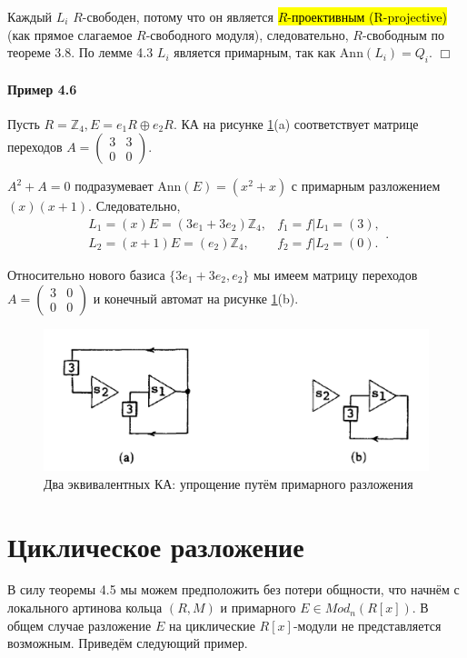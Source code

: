 \documentclass[a4paper,12pt]{article}
\newcommand{\Ann}{\text{Ann}}
\begin{document}
Каждый $L_i$ $R$-свободен, потому что он является \hl{$R$-проективным (R-projective)} (как прямое слагаемое $R$-свободного модуля), следовательно, $R$-свободным по теореме 3.8. По лемме 4.3 $L_i$ является примарным, так как $\Ann(L_i) = Q_i$. $\Box$

\paragraph{Пример 4.6}
Пусть $R = \mathbb{Z}_4, E = e_1 R \oplus e_2 R$. КА на рисунке \ref{fig3ab}(a) соответствует матрице переходов
$ A =
\begin{pmatrix}
	3 & 3\\
	0 & 0
\end{pmatrix}
$.

$A^2 + A = 0$ подразумевает $\Ann(E) = (x^2 + x)$ с  примарным разложением $(x)(x + 1)$. Следовательно,
$$
\begin{array}{cc}
L_1 = (x)E = (3 e_1 + 3 e_2) \mathbb{Z}_4, & f_1 = f | L_1 = (3), \\
L_2 = (x+1)E = (e_2) \mathbb{Z}_4, & f_2 = f|L_2 = (0).
\end{array}.
$$

Относительно нового базиса $\{3 e_1 + 3 e_2, e_2\}$ мы имеем матрицу переходов ${ A =
\begin{pmatrix}
	3 & 0\\
	0 & 0
\end{pmatrix}}
$ и конечный автомат на рисунке \ref{fig3ab}(b).

\begin{figure}[h]
	\centering
	\includegraphics[width=0.7\linewidth]{pictures/fig3ab.png}
	\caption{Два эквивалентных КА: упрощение путём примарного разложения}
	\label{fig3ab}
\end{figure}

\section{Циклическое разложение}
В силу теоремы 4.5 мы можем предположить без потери общности, что начнём с локального артинова кольца $(R,M)$ и примарного $E \in Mod_n(R[x])$. В общем случае разложение $E$ на циклические $R[x]$-модули не представляется возможным. Приведём следующий пример.
\end{document}
